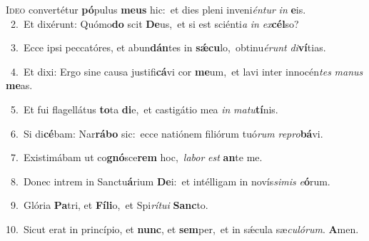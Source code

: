 \lettrine{\initial\textcolor{\initialcolor}{I}}{deo} convertétur \textbf{pó}\-pulus \textbf{me}\-\textbf{us} hic:~\star et dies pleni inveni\-\textit{én}\-\textit{tur} \textit{in} \textbf{e}\-is.\\
{\numbfont\textcolor{\numbcolor}{~2.}}~Et dixérunt: Quómo\textbf{do} scit \textbf{De}\-us,~\star et si est sciénti\textit{a} \textit{in} \textit{ex}\-\textbf{cél}so?\par
{\numbfont\textcolor{\numbcolor}{~3.}}~Ecce ipsi peccatóres, et abun\-\textbf{dán}\-tes in \textbf{sǽ}\-\textbf{cu}lo,~\star obtinu\-\textit{é}\-\textit{runt} \textit{di}\-\textbf{ví}tias.\par
{\numbfont\textcolor{\numbcolor}{~4.}}~Et dixi: Ergo sine causa justifi\-\textbf{cá}\-vi cor \textbf{me}\-um,~\star et lavi inter innocén\textit{tes} \textit{ma}\-\textit{nus} \textbf{me}\-as.\par
{\numbfont\textcolor{\numbcolor}{~5.}}~Et fui flagellátus \textbf{to}\-ta \textbf{di}\-e,~\star et castigátio mea \textit{in} \textit{ma}\-\textit{tu}\textbf{tí}nis.\par
{\numbfont\textcolor{\numbcolor}{~6.}}~Si di\-\textbf{cé}\-bam: Nar\-\textbf{rá}\-\textbf{bo} sic:~\star ecce natiónem filiórum tuó\textit{rum} \textit{re}\-\textit{pro}\textbf{bá}vi.\par
{\numbfont\textcolor{\numbcolor}{~7.}}~Existimábam ut co\-\textbf{gnó}\-sce\textbf{rem} hoc,~\star \textit{la}\-\textit{bor} \textit{est} \textbf{an}\-te me.\par
{\numbfont\textcolor{\numbcolor}{~8.}}~Donec intrem in Sanctu\-\textbf{á}\-rium \textbf{De}\-i:~\star et intélligam in novís\-\textit{si}\-\textit{mis} \textit{e}\-\textbf{ó}rum.\par
{\numbfont\textcolor{\numbcolor}{~9.}}~Glória \textbf{Pa}\-tri, et \textbf{Fí}\-\textbf{li}o,~\star et Spi\-\textit{rí}\-\textit{tu}\textit{i} \textbf{Sanc}\-to.\par
{\numbfont\textcolor{\numbcolor}{10.}}~Sicut erat in princípio, et \textbf{nunc}\-, et \textbf{sem}\-per,~\star et in sǽcula sæ\-\textit{cu}\-\textit{ló}\textit{rum}. \textbf{A}\-men.\par
